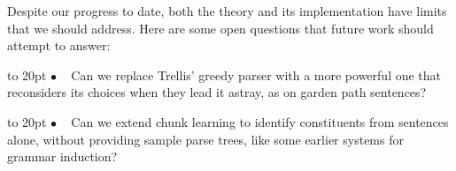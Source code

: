 \documentclass[11pt,letterpaper]{article}
\def\trellis/{{\sc Trellis}}
\def\texitem#1{\par\noindent\hangindent 20pt
               \hbox to 20pt {\hss #1 ~}\ignorespaces}
\def\bull{\texitem{$\bullet$}}
\begin{document}
% 
% 
% 
% 
% 
% 

Despite our progress to date, both the theory and its implementation
have limits that we should address. Here are some open questions 
that future work should attempt to answer: 

\vskip 0.05in

\bull
Can we replace \trellis/' greedy parser with a more powerful one that
reconsiders its choices when they lead it astray, as on garden path 
sentences?

\bull
Can we extend chunk learning to identify constituents from sentences 
alone, without providing sample parse trees, like some earlier systems 
for grammar induction?
\end{document}
